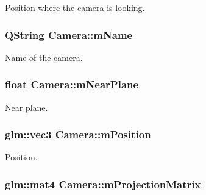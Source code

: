 Position where the camera is looking. 

\hypertarget{class_camera_a236dc6770d98461537d95794178be50f}{
\subsubsection[{m\+Name}]{\setlength{\rightskip}{0pt plus 5cm}Q\+String Camera\+::m\+Name}}\label{class_camera_a236dc6770d98461537d95794178be50f}


Name of the camera. 

\hypertarget{class_camera_abb0faed21056b2a7bca13285ae674382}{
\subsubsection[{m\+Near\+Plane}]{\setlength{\rightskip}{0pt plus 5cm}float Camera\+::m\+Near\+Plane\hspace{0.3cm}{\ttfamily [protected]}}}\label{class_camera_abb0faed21056b2a7bca13285ae674382}


Near plane. 

\hypertarget{class_camera_a14baadec94c94b7f8e833bd5b091565a}{
\subsubsection[{m\+Position}]{\setlength{\rightskip}{0pt plus 5cm}glm\+::vec3 Camera\+::m\+Position\hspace{0.3cm}{\ttfamily [protected]}}}\label{class_camera_a14baadec94c94b7f8e833bd5b091565a}


Position. 

\hypertarget{class_camera_ac1fd207cb3b4c13e0109cb7391937ea2}{
\subsubsection[{m\+Projection\+Matrix}]{\setlength{\rightskip}{0pt plus 5cm}glm\+::mat4 Camera\+::m\+Projection\+Matrix\hspace{0.3cm}{\ttfamily [protected]}}}\label{class_camera_ac1fd207cb3b4c13e0109cb7391937ea2}


